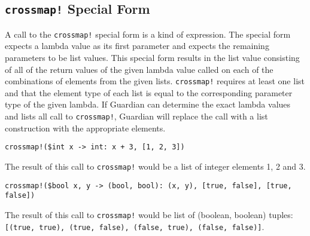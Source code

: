 
\subsection{\texttt{crossmap!} Special Form}
{
	A call to the \texttt{crossmap!} special form is a kind of expression.
	The special form expects a lambda value as its
	first parameter and expects the remaining parameters to be list values.
	This special form results in the list value consisting
	of all of the return values of the given lambda value called on each of
	the combinations of elements from the given lists.
	\texttt{crossmap!} requires at least one list and that
	the element type of each list is equal to the corresponding parameter type
	of the given lambda.
	If Guardian can determine the exact lambda values and lists all call to
	\texttt{crossmap!}, Guardian will replace the call with a list
	construction with the appropriate elements.
	
	\begin{itemize}
	{
		\item \texttt{crossmap!(\$int x -> int: x + 3, [1, 2, 3])}
		
			The result of this call to \texttt{crossmap!} would be a list of
			integer elements 1, 2 and 3.
		
		\item \texttt{crossmap!(\$bool x, y -> (bool, bool): (x, y), [true, false], [true, false])}
		
			The result of this call to \texttt{crossmap!} would be list of
			(boolean, boolean)
			tuples: \texttt{[(true, true), (true, false), (false, true), (false, false)]}.
	}
	\end{itemize}
}
